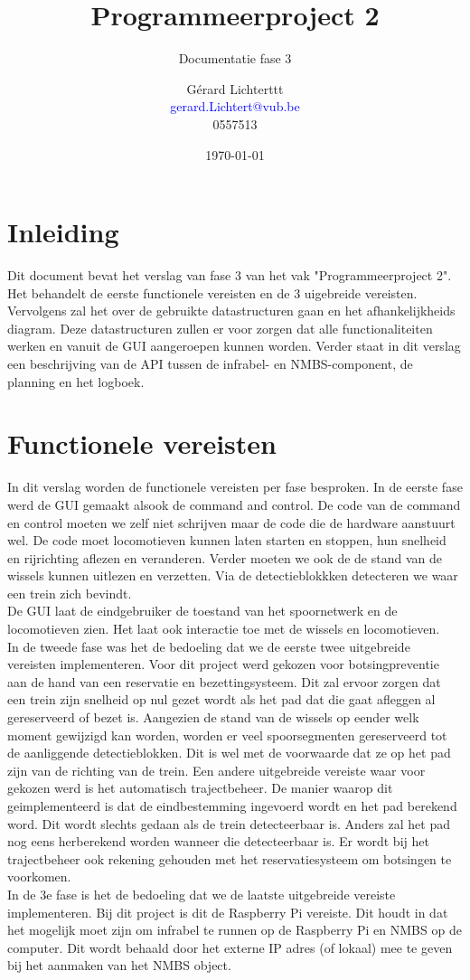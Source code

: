 \documentclass{article}
\title{Programmeerproject 2}
\subtitle{Documentatie fase 3}
\author{Gérard Lichterttt\\
        \textcolor{blue}{gerard.Lichtert@vub.be}\\
        \textcolor{myblueish}{0557513}}
\date{\today}
\begin{document}
\maketitle
\tableofcontents
\pagebreak
\section{Inleiding}
Dit document bevat het verslag van fase 3 van het vak "Programmeerproject 2". Het behandelt 
de eerste functionele vereisten en de 3 uigebreide vereisten. 
Vervolgens zal het over de gebruikte datastructuren gaan en het afhankelijkheids diagram. 
Deze datastructuren zullen er voor zorgen dat alle functionaliteiten werken en vanuit 
de GUI aangeroepen kunnen worden. Verder staat in dit verslag een beschrijving van de API tussen
de infrabel- en NMBS-component, de planning en het logboek. 
\section{Functionele vereisten}
In dit verslag worden de functionele vereisten per fase besproken. In de eerste fase werd de 
GUI gemaakt alsook de command and control. De code van de command en control moeten we zelf
niet schrijven maar de code die de hardware aanstuurt wel. De code moet locomotieven kunnen laten
starten en stoppen, hun snelheid en rijrichting aflezen en veranderen. Verder moeten we ook de 
de stand van de wissels kunnen uitlezen en verzetten. Via de detectieblokkken detecteren we waar 
een trein zich bevindt. \\
De GUI laat de eindgebruiker de toestand van het spoornetwerk en de locomotieven zien. Het laat 
ook interactie toe met de wissels en locomotieven. \\
In de tweede fase was het de bedoeling dat we de eerste twee uitgebreide vereisten implementeren. Voor dit project werd 
gekozen voor botsingpreventie aan de hand van een reservatie en bezettingsysteem. Dit zal ervoor zorgen dat een trein zijn snelheid 
op nul gezet wordt als het pad dat die gaat afleggen al gereserveerd of bezet is. Aangezien de stand van de wissels op eender welk moment gewijzigd kan worden, worden
er veel spoorsegmenten gereserveerd tot de aanliggende detectieblokken. Dit is wel met de voorwaarde dat ze op het pad zijn van de richting van de trein. Een andere
uitgebreide vereiste waar voor gekozen werd is het automatisch trajectbeheer. De manier waarop dit geimplementeerd is dat de eindbestemming ingevoerd wordt en het pad berekend
word. Dit wordt slechts gedaan als de trein detecteerbaar is. Anders zal het pad nog eens herberekend worden wanneer die detecteerbaar is. Er wordt bij het trajectbeheer
ook rekening gehouden met het reservatiesysteem om botsingen te voorkomen. \\
In de 3e fase is het de bedoeling dat we de laatste uitgebreide vereiste implementeren. Bij dit project is dit de Raspberry Pi vereiste. Dit houdt in dat het mogelijk
moet zijn om infrabel te runnen op de Raspberry Pi en NMBS op de computer. Dit wordt behaald door het externe IP adres (of lokaal) mee te geven bij het aanmaken van het NMBS object.
\pagebreak
\end{document}
